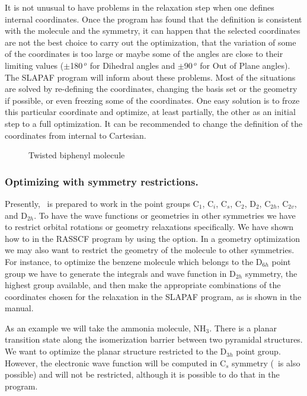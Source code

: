 It is not unusual to have problems in the relaxation step when
one defines internal coordinates. Once the program has found that
the definition is consistent with the molecule and the symmetry,
it can happen that the selected coordinates are not the best choice
to carry out the optimization, that the variation of some of the
coordinates is too large or maybe some of the angles are close
to their limiting values ($\pm$180$\,^o$ for Dihedral angles and
$\pm$90$\,^o$ for Out of Plane angles). The SLAPAF program will
inform about these problems. Most of the situations are solved by
re-defining the coordinates, changing the basis set or the geometry
if possible, or even freezing some of the coordinates. 
One easy solution is to froze this particular coordinate and optimize,
at least partially, the other as an initial step to a full 
optimization. It can be recommended to change the definition of the
coordinates from internal to Cartesian.

\begin{figure}[hp]
\caption{\label{fig:biphenyl}Twisted biphenyl molecule}
\end{figure}

\subsubsection{Optimizing with symmetry restrictions.}

Presently, \molcas\ is prepared to work in the point groups
C$_1$, C$_i$, C$_s$, C$_2$, D$_2$, C$_{2h}$, C$_{2v}$, and D$_{2h}$.
To have the wave functions or geometries in other symmetries we
have to restrict orbital rotations or geometry relaxations specifically.
We have shown how to in the RASSCF program by using the 
 option. In a geometry optimization we may also want to
restrict the geometry of the molecule to other symmetries. For
instance, to optimize the benzene molecule which belongs to the
D$_{6h}$ point group we have to generate the integrals and
wave function in D$_{2h}$ symmetry, the highest group available,
and then make the appropriate combinations of the coordinates
chosen for the relaxation in the SLAPAF program, as is shown
in the manual.


As an example we will take the ammonia molecule, NH$_3$. There is
a planar transition state along the isomerization barrier between
two pyramidal structures. We want to optimize the planar structure
restricted to the D$_{3h}$ point group. However, the electronic wave function will
be computed in C$_s$ symmetry (\Ctv\ is also possible)
and will not be restricted, although it is possible to do that
in the  program.

